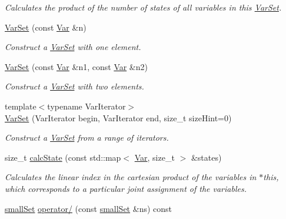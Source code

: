 \begin{CompactItemize}
\begin{CompactList}\small\item\em Calculates the product of the number of states of all variables in this \hyperlink{classdai_1_1VarSet}{VarSet}. \item\end{CompactList}\item 
\hypertarget{classdai_1_1VarSet_aeecbc24db4c8fcc11ff714add9fe0b6}{
\hyperlink{classdai_1_1VarSet_aeecbc24db4c8fcc11ff714add9fe0b6}{VarSet} (const \hyperlink{classdai_1_1Var}{Var} \&n)}
\label{classdai_1_1VarSet_aeecbc24db4c8fcc11ff714add9fe0b6}

\begin{CompactList}\small\item\em Construct a \hyperlink{classdai_1_1VarSet}{VarSet} with one element. \item\end{CompactList}\item 
\hypertarget{classdai_1_1VarSet_e666bad38239e0ca2f43d4a7647fc29e}{
\hyperlink{classdai_1_1VarSet_e666bad38239e0ca2f43d4a7647fc29e}{VarSet} (const \hyperlink{classdai_1_1Var}{Var} \&n1, const \hyperlink{classdai_1_1Var}{Var} \&n2)}
\label{classdai_1_1VarSet_e666bad38239e0ca2f43d4a7647fc29e}

\begin{CompactList}\small\item\em Construct a \hyperlink{classdai_1_1VarSet}{VarSet} with two elements. \item\end{CompactList}\item 
{\footnotesize template$<$typename VarIterator$>$ }\\\hyperlink{classdai_1_1VarSet_85468ed9f66a25fbbd65ae44ccd49473}{VarSet} (VarIterator begin, VarIterator end, size\_\-t sizeHint=0)
\begin{CompactList}\small\item\em Construct a \hyperlink{classdai_1_1VarSet}{VarSet} from a range of iterators. \item\end{CompactList}\item 
size\_\-t \hyperlink{classdai_1_1VarSet_a6fd950faa6961c9786e96b04ee2dee1}{calcState} (const std::map$<$ \hyperlink{classdai_1_1Var}{Var}, size\_\-t $>$ \&states)
\begin{CompactList}\small\item\em Calculates the linear index in the cartesian product of the variables in $\ast$this, which corresponds to a particular joint assignment of the variables. \item\end{CompactList}\item 
\hypertarget{classdai_1_1smallSet_daa0dd9b812a6254226965227c0d4828}{
\hyperlink{classdai_1_1smallSet}{smallSet} \hyperlink{classdai_1_1smallSet_daa0dd9b812a6254226965227c0d4828}{operator/} (const \hyperlink{classdai_1_1smallSet}{smallSet} \&ns) const }
\label{classdai_1_1smallSet_daa0dd9b812a6254226965227c0d4828}


\end{CompactItemize}

